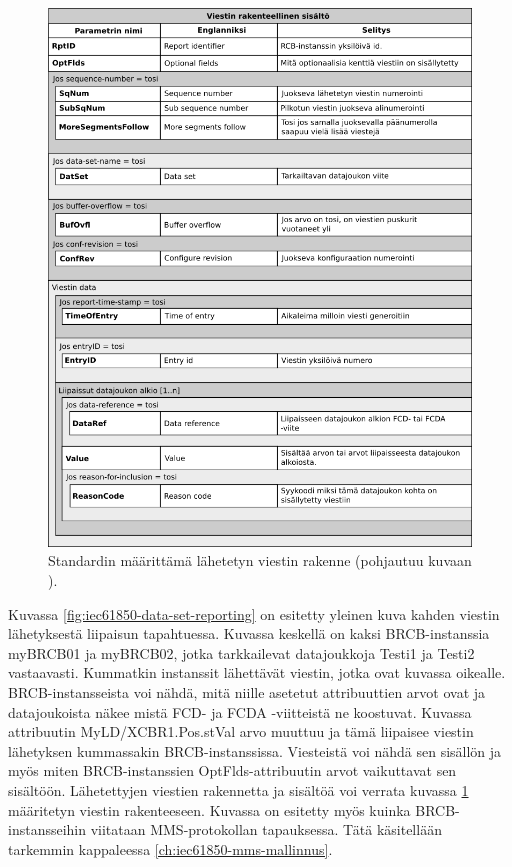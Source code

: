 \begin{figure}[ht!]
	\includegraphics[width=1\textwidth]{pictures/iec61850-report-format.png}
	\caption{Standardin määrittämä lähetetyn viestin rakenne (pohjautuu kuvaan \cite[s.~104]{IEC61850-7-2}).}
	\label{fig:iec61850-report-format}
\end{figure}

Kuvassa \ref{fig:iec61850-data-set-reporting} on esitetty yleinen kuva kahden viestin lähetyksestä liipaisun tapahtuessa. Kuvassa keskellä on kaksi BRCB-instanssia myBRCB01 ja myBRCB02, jotka tarkkailevat datajoukkoja Testi1 ja Testi2 vastaavasti. Kummatkin instanssit lähettävät viestin, jotka ovat kuvassa oikealle. BRCB-instansseista voi nähdä, mitä niille asetetut attribuuttien arvot ovat ja datajoukoista näkee mistä FCD- ja FCDA -viitteistä ne koostuvat. Kuvassa attribuutin MyLD/XCBR1.Pos.stVal arvo muuttuu ja tämä liipaisee viestin lähetyksen kummassakin BRCB-instanssissa. Viesteistä voi nähdä sen sisällön ja myös miten BRCB-instanssien OptFlds-attribuutin arvot vaikuttavat sen sisältöön. Lähetettyjen viestien rakennetta ja sisältöä voi verrata kuvassa \ref{fig:iec61850-report-format} määritetyn viestin rakenteeseen. Kuvassa on esitetty myös kuinka BRCB-instansseihin viitataan MMS-protokollan tapauksessa. Tätä käsitellään tarkemmin kappaleessa \ref{ch:iec61850-mms-mallinnus}.

